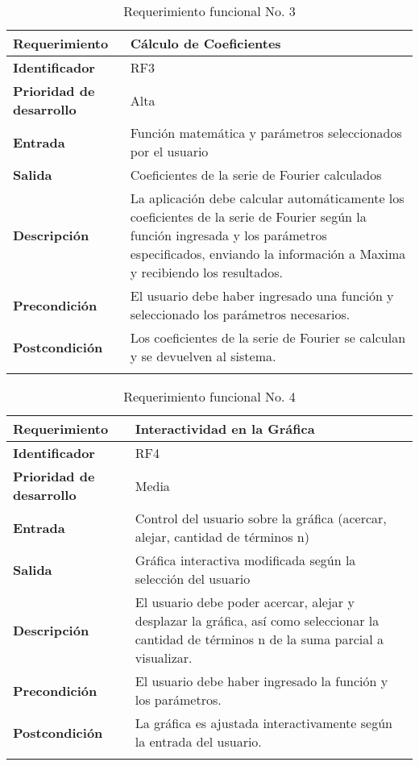 \begin{longtable}{|m{3.5cm}|m{9.5cm}|}
	\hline
	\rowcolor{black!75} \color{white}\textbf{Requerimiento} & \color{white}\textbf{Cálculo de Coeficientes} \\
	\hline
	\textbf{Identificador} & RF3 \\
	\hline
	\textbf{Prioridad de desarrollo} & Alta \\
	\hline
	\textbf{Entrada} & Función matemática y parámetros seleccionados por el usuario \\
	\hline
	\textbf{Salida} & Coeficientes de la serie de Fourier calculados \\
	\hline
	\textbf{Descripción} & La aplicación debe calcular automáticamente los coeficientes de la serie de Fourier según la función ingresada y los parámetros especificados, enviando la información a Maxima y recibiendo los resultados. \\
	\hline
	\textbf{Precondición} & El usuario debe haber ingresado una función y seleccionado los parámetros necesarios. \\
	\hline
	\textbf{Postcondición} & Los coeficientes de la serie de Fourier se calculan y se devuelven al sistema. \\
	\hline
	\rowcolor{white} \caption{Requerimiento funcional No. 3} \label{tabla:RF3} \\
\end{longtable}


\begin{longtable}{|m{3.5cm}|m{9.5cm}|}
	\hline
	\rowcolor{black!75} \color{white}\textbf{Requerimiento} & \color{white}\textbf{Interactividad en la Gráfica} \\
	\hline
	\textbf{Identificador} & RF4 \\
	\hline
	\textbf{Prioridad de desarrollo} & Media \\
	\hline
	\textbf{Entrada} & Control del usuario sobre la gráfica (acercar, alejar, cantidad de términos n) \\
	\hline
	\textbf{Salida} & Gráfica interactiva modificada según la selección del usuario \\
	\hline
	\textbf{Descripción} & El usuario debe poder acercar, alejar y desplazar la gráfica, así como seleccionar la cantidad de términos n de la suma parcial a visualizar. \\
	\hline
	\textbf{Precondición} & El usuario debe haber ingresado la función y los parámetros. \\
	\hline
	\textbf{Postcondición} & La gráfica es ajustada interactivamente según la entrada del usuario. \\
	\hline
	\rowcolor{white} \caption{Requerimiento funcional No. 4} \label{tabla:RF4} \\
\end{longtable}

